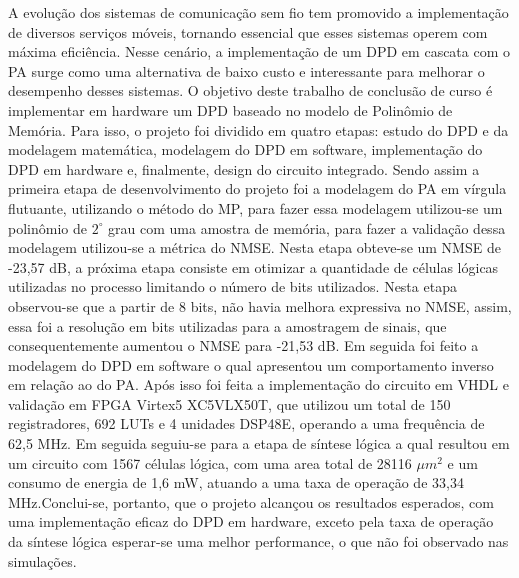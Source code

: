 A evolução dos sistemas de comunicação sem fio tem promovido a implementação de diversos serviços móveis, tornando essencial que esses sistemas operem com máxima eficiência. Nesse cenário, a implementação de um DPD em cascata com o PA surge como uma alternativa de baixo custo e interessante para melhorar o desempenho desses sistemas.
O objetivo deste trabalho de conclusão de curso é implementar em hardware um DPD baseado no modelo de Polinômio de Memória. Para isso, o projeto foi dividido em quatro etapas: estudo do DPD e da modelagem matemática, modelagem do DPD em software, implementação do DPD em hardware e, finalmente, design do circuito integrado.
Sendo assim a primeira etapa de desenvolvimento do projeto foi a modelagem do PA em vírgula flutuante, utilizando o método do MP, para fazer essa modelagem utilizou-se um polinômio de $2^\circ$ grau com uma amostra de memória, para fazer a validação dessa modelagem utilizou-se a métrica do NMSE. Nesta etapa obteve-se um NMSE de -23,57 dB, a próxima etapa consiste em otimizar a quantidade de células lógicas utilizadas no processo limitando o número de bits utilizados. Nesta etapa observou-se que a partir de 8 bits, não havia melhora expressiva no NMSE, assim, essa foi a resolução em bits utilizadas para a amostragem de sinais, que consequentemente aumentou o NMSE para -21,53 dB. Em seguida foi feito a modelagem do DPD em software o qual apresentou um comportamento inverso em relação ao do PA. Após isso foi feita a implementação do circuito em VHDL e validação em FPGA Virtex5 XC5VLX50T, que utilizou um total de 150 registradores, 692 LUTs e 4 unidades DSP48E, operando a uma frequência de 62,5 MHz. Em seguida seguiu-se para a etapa de síntese lógica a qual resultou em um circuito com 1567 células lógica, com uma area total de 28116 $ \mu m^2$ e um consumo de energia de 1,6 mW, atuando a uma taxa de operação de 33,34 MHz.Conclui-se, portanto, que o projeto alcançou os resultados esperados, com uma implementação eficaz do DPD em hardware, exceto pela taxa de operação da síntese lógica esperar-se uma melhor performance, o que não foi observado nas simulações.
